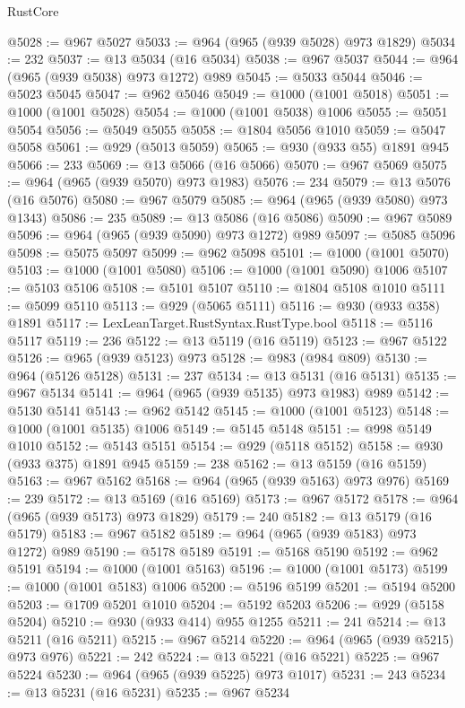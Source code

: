 \begin{lexlean}{RustCore}
\begin{coremodule}
@5028 := @967 @5027
@5033 := @964 (@965 (@939 @5028) @973 @1829)
@5034 := 232
@5037 := @13 @5034 (@16 @5034)
@5038 := @967 @5037
@5044 := @964 (@965 (@939 @5038) @973 @1272) @989
@5045 := @5033 @5044
@5046 := @5023 @5045
@5047 := @962 @5046
@5049 := @1000 (@1001 @5018)
@5051 := @1000 (@1001 @5028)
@5054 := @1000 (@1001 @5038) @1006
@5055 := @5051 @5054
@5056 := @5049 @5055
@5058 := @1804 @5056 @1010
@5059 := @5047 @5058
@5061 := @929 (@5013 @5059)
@5065 := @930 (@933 @55) @1891 @945
@5066 := 233
@5069 := @13 @5066 (@16 @5066)
@5070 := @967 @5069
@5075 := @964 (@965 (@939 @5070) @973 @1983)
@5076 := 234
@5079 := @13 @5076 (@16 @5076)
@5080 := @967 @5079
@5085 := @964 (@965 (@939 @5080) @973 @1343)
@5086 := 235
@5089 := @13 @5086 (@16 @5086)
@5090 := @967 @5089
@5096 := @964 (@965 (@939 @5090) @973 @1272) @989
@5097 := @5085 @5096
@5098 := @5075 @5097
@5099 := @962 @5098
@5101 := @1000 (@1001 @5070)
@5103 := @1000 (@1001 @5080)
@5106 := @1000 (@1001 @5090) @1006
@5107 := @5103 @5106
@5108 := @5101 @5107
@5110 := @1804 @5108 @1010
@5111 := @5099 @5110
@5113 := @929 (@5065 @5111)
@5116 := @930 (@933 @358) @1891
@5117 := LexLeanTarget.RustSyntax.RustType.bool
@5118 := @5116 @5117
@5119 := 236
@5122 := @13 @5119 (@16 @5119)
@5123 := @967 @5122
@5126 := @965 (@939 @5123) @973
@5128 := @983 (@984 @809)
@5130 := @964 (@5126 @5128)
@5131 := 237
@5134 := @13 @5131 (@16 @5131)
@5135 := @967 @5134
@5141 := @964 (@965 (@939 @5135) @973 @1983) @989
@5142 := @5130 @5141
@5143 := @962 @5142
@5145 := @1000 (@1001 @5123)
@5148 := @1000 (@1001 @5135) @1006
@5149 := @5145 @5148
@5151 := @998 @5149 @1010
@5152 := @5143 @5151
@5154 := @929 (@5118 @5152)
@5158 := @930 (@933 @375) @1891 @945
@5159 := 238
@5162 := @13 @5159 (@16 @5159)
@5163 := @967 @5162
@5168 := @964 (@965 (@939 @5163) @973 @976)
@5169 := 239
@5172 := @13 @5169 (@16 @5169)
@5173 := @967 @5172
@5178 := @964 (@965 (@939 @5173) @973 @1829)
@5179 := 240
@5182 := @13 @5179 (@16 @5179)
@5183 := @967 @5182
@5189 := @964 (@965 (@939 @5183) @973 @1272) @989
@5190 := @5178 @5189
@5191 := @5168 @5190
@5192 := @962 @5191
@5194 := @1000 (@1001 @5163)
@5196 := @1000 (@1001 @5173)
@5199 := @1000 (@1001 @5183) @1006
@5200 := @5196 @5199
@5201 := @5194 @5200
@5203 := @1709 @5201 @1010
@5204 := @5192 @5203
@5206 := @929 (@5158 @5204)
@5210 := @930 (@933 @414) @955 @1255
@5211 := 241
@5214 := @13 @5211 (@16 @5211)
@5215 := @967 @5214
@5220 := @964 (@965 (@939 @5215) @973 @976)
@5221 := 242
@5224 := @13 @5221 (@16 @5221)
@5225 := @967 @5224
@5230 := @964 (@965 (@939 @5225) @973 @1017)
@5231 := 243
@5234 := @13 @5231 (@16 @5231)
@5235 := @967 @5234

\end{coremodule}
\end{lexlean}
